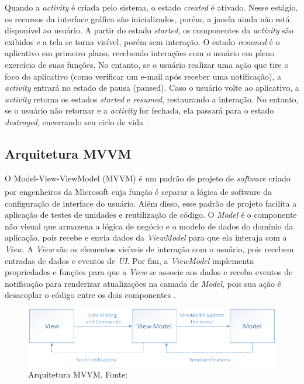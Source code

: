 Quando a \textit{activity} é criada pelo sistema, o estado \textit{created} é ativado. Nesse estágio, os recursos da interface gráfica 
são inicializados, porém, a janela ainda não está disponível ao usuário. A partir do estado \textit{started}, os componentes da \textit{activity} são exibidos e a tela se torna visível, porém sem interação.
O estado \textit{resumed} é o aplicativo em primeiro plano, recebendo interações com o usuário em pleno exercício de suas funções. No entanto, se o usuário realizar uma ação que tire 
o foco do aplicativo (como verificar um e-mail após receber uma notificação), a \textit{activity} entrará no estado de pausa (paused).
Caso o usuário volte ao aplicativo, a \textit{activity} retoma os estados \textit{started} e \textit{resumed}, restaurando a interação. No entanto, se o usuário não retornar e a \textit{activity} for fechada, 
ela passará para o estado \textit{destroyed}, encerrando seu ciclo de vida \cite{google-developers-activity-lifecycle}.

\subsection{Arquitetura MVVM}

O Model-View-ViewModel (MVVM) é um padrão de projeto de \textit{software} criado por engenheiros da Microsoft\textsuperscript{\textregistered} 
cuja função é separar a lógica de software da configuração de interface do usuário. Além disso, esse padrão de projeto facilita a aplicação de testes de unidades e reutilização 
de código. O \textit{Model} é o componente não visual que armazena a lógica de negócio e o modelo de dados do domínio da aplicação, pois recebe e envia dados da \textit{ViewModel} 
para que ela interaja com a \textit{View}. A \textit{View} são os elementos visíveis de interação com o usuário, pois recebem entradas de dados e eventos de \textit{UI}. Por fim, a
\textit{ViewModel} implementa propriedades e funções para que a \textit{View} se associe aos dados e receba eventos de notificação para renderizar atualizações na camada de \textit{Model}, pois
sua ação é desacoplar o código entre os dois componentes \cite{mvvm-documentation}.

\begin{figure}[ht]
    \centering
    \includegraphics[width=.87\textwidth]{img/mvvm-pattern.png}
    \caption{Arquitetura MVVM. Fonte: \cite{mvvm-documentation}}\label{figMVVM}
\end{figure}

